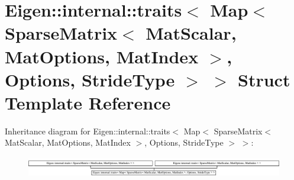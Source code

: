 \hypertarget{struct_eigen_1_1internal_1_1traits_3_01_map_3_01_sparse_matrix_3_01_mat_scalar_00_01_mat_optionsc906e4e1b3a968ac003455586a92664c}{}\section{Eigen\+:\+:internal\+:\+:traits$<$ Map$<$ Sparse\+Matrix$<$ Mat\+Scalar, Mat\+Options, Mat\+Index $>$, Options, Stride\+Type $>$ $>$ Struct Template Reference}
\label{struct_eigen_1_1internal_1_1traits_3_01_map_3_01_sparse_matrix_3_01_mat_scalar_00_01_mat_optionsc906e4e1b3a968ac003455586a92664c}
Inheritance diagram for Eigen\+:\+:internal\+:\+:traits$<$ Map$<$ Sparse\+Matrix$<$ Mat\+Scalar, Mat\+Options, Mat\+Index $>$, Options, Stride\+Type $>$ $>$\+:\begin{figure}[H]
\begin{center}
\leavevmode
\includegraphics[height=0.906149cm]{struct_eigen_1_1internal_1_1traits_3_01_map_3_01_sparse_matrix_3_01_mat_scalar_00_01_mat_optionsc906e4e1b3a968ac003455586a92664c}
\end{center}
\end{figure}
